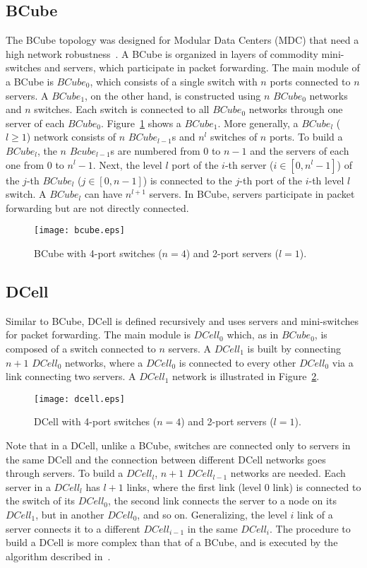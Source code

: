 \subsection{BCube}
\label{bcube}

The BCube topology was designed for Modular Data Centers (MDC) that need a high network robustness~\cite{guo2009bcube}. A BCube is organized in layers of commodity mini-switches and servers, which participate in packet forwarding. The main module of a BCube is $BCube_0$, which consists of a single switch with $n$ ports connected to $n$ servers.
A $BCube_1$, on the other hand, is constructed using $n$ $BCube_0$ networks and $n$ switches. Each switch is connected to all $BCube_0$ networks through one server of each $BCube_0$.
Figure~\ref{fig:bcube} shows a $BCube_1$. More generally, a $BCube_l$ ($l \geq 1$) network consists of $n$ $BCube_{l-1}$s and $n^l$ switches of $n$ ports.
To build a $BCube_l$, the $n$ $Bcube_{l-1}$s are numbered from 0 to $n-1$ and the servers of each one from 0 to $n^l - 1$.
Next, the level $l$ port of the $i$-th server ($i \in [0,n^l - 1]$) of the $j$-th $BCube_l$ ($j \in [0,n-1]$) is connected to the $j$-th port of the $i$-th level $l$ switch.
A $BCube_l$ can have $n^{l+1}$ servers.
In BCube, servers participate in packet forwarding but are not directly connected.
\begin{figure}
\centering
\texttt{[image: bcube.eps]}
\caption{BCube with 4-port switches ($n=4$) and 2-port servers ($l=1$).}
\label{fig:bcube}
\end{figure}

\subsection{DCell}
\label{dcell}

Similar to BCube, DCell is defined recursively and uses servers and mini-switches for packet forwarding.
The main module is $DCell_0$ which, as in $BCube_0$, is composed of a switch connected to $n$ servers.
A $DCell_1$ is built by connecting $n + 1$ $DCell_0$ networks, where a $DCell_0$ is connected to every other $DCell_0$ via a link connecting two servers.
A $DCell_1$ network is illustrated in Figure~\ref{fig:dcell}.
\begin{figure}
\centering
\texttt{[image: dcell.eps]}
\caption{DCell with 4-port switches ($n=4$) and 2-port servers ($l=1$).}
\label{fig:dcell}
\end{figure}

Note that in a DCell, unlike a BCube, switches are connected only to servers in the same DCell and the connection between different DCell
networks goes through servers. To build a $DCell_l$, $n + 1$ $DCell_{l-1}$ networks are needed. Each server in a $DCell_l$ has $l+1$ links, where the first link (level 0 link) is connected to the switch of its $DCell_0$, the second link connects the server to a node on its $DCell_1$, but in another $DCell_0$, and so on. Generalizing, the level $i$ link of a server connects it to a different $DCell_{i-1}$ in the same $DCell_{i}$. The procedure to build a DCell is more complex than that of a BCube, and is executed by the algorithm described in~\cite{guo2008dcell}.

